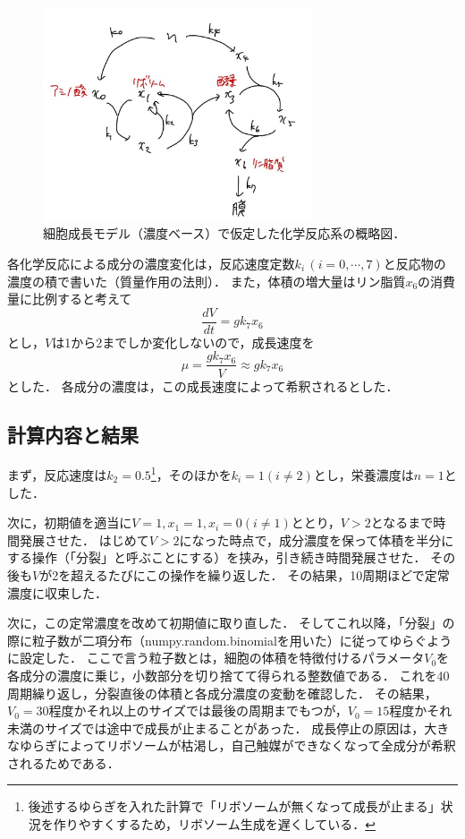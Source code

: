 \documentclass[a4paper,11pt]{jsarticle}
\begin{document}
\begin{figure}[htbp]
  \centering
  \includegraphics[width=8cm]{cell2_set.jpg}
  \caption{細胞成長モデル（濃度ベース）で仮定した化学反応系の概略図．}
  \label{fig:cell2_set}
\end{figure}

各化学反応による成分の濃度変化は，反応速度定数$k_i\,(i=0,\cdots,7)$と反応物の濃度の積で書いた（質量作用の法則）．
また，体積の増大量はリン脂質$x_6$の消費量に比例すると考えて
\begin{equation}
  \frac{dV}{dt} = g k_7 x_6
\end{equation}
とし，$V$は1から2までしか変化しないので，成長速度を
\begin{equation}
  \mu = \frac{g k_7 x_6}{V} \approx gk_7 x_6
\end{equation}
とした．
各成分の濃度は，この成長速度によって希釈されるとした．


\subsection{計算内容と結果}

まず，反応速度は$k_2=0.5$\footnote{後述するゆらぎを入れた計算で「リボソームが無くなって成長が止まる」状況を作りやすくするため，リボソーム生成を遅くしている．}，そのほかを$k_i=1(i\neq 2)$とし，栄養濃度は$n=1$とした．

次に，初期値を適当に$V=1, x_1=1, x_i=0(i\neq 1)$ととり，$V>2$となるまで時間発展させた．
はじめて$V>2$になった時点で，成分濃度を保って体積を半分にする操作（「分裂」と呼ぶことにする）を挟み，引き続き時間発展させた．
その後も$V$が2を超えるたびにこの操作を繰り返した．
その結果，10周期ほどで定常濃度に収束した．

次に，この定常濃度を改めて初期値に取り直した．
そしてこれ以降，「分裂」の際に粒子数が二項分布（numpy.random.binomialを用いた）に従ってゆらぐように設定した．
ここで言う粒子数とは，細胞の体積を特徴付けるパラメータ$V_0$を各成分の濃度に乗じ，小数部分を切り捨てて得られる整数値である．
これを40周期繰り返し，分裂直後の体積と各成分濃度の変動を確認した．
その結果，$V_0=30$程度かそれ以上のサイズでは最後の周期までもつが，$V_0=15$程度かそれ未満のサイズでは途中で成長が止まることがあった．
成長停止の原因は，大きなゆらぎによってリボソームが枯渇し，自己触媒ができなくなって全成分が希釈されるためである．
\end{document}
